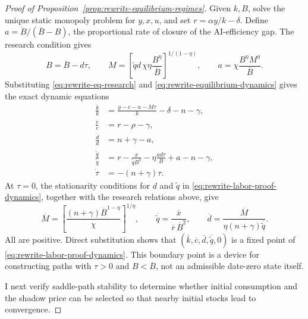\begin{proof}[Proof of Proposition~\ref{prop:rewrite-equilibrium-regimes}]
Given $k,B$, solve the unique static monopoly
problem for $y,x,u$, and set $r=\alpha y/k-\delta$.
Define $a=\dot B/(\overline B-B)$, the proportional rate of closure of the
AI-efficiency gap. The research condition gives
\[
 B=\overline B-d\tau,\qquad
 M=\left[\widetilde qd\,\chi\eta\frac{B^\eta}{\overline B}
       \right]^{1/(1-\eta)},\qquad
 a=\chi\frac{B^\eta M^\eta}{\overline B}.
\]
Substituting \eqref{eq:rewrite-eq-research} and
\eqref{eq:rewrite-equilibrium-dynamics} gives the exact dynamic equations
\begin{subequations}
\label{eq:rewrite-labor-proof-dynamics}
\begin{align}
 \frac{\dot k}{k}&=\frac{y-c-u-M\tau}{k}-\delta-n-\gamma,\\
 \frac{\dot c}{c}&=r-\rho-\gamma,\\
 \frac{\dot d}{d}&=n+\gamma-a,\\
 \frac{\dot{\widetilde q}}{\widetilde q}
 &=r-\frac{x}{\widetilde qB^2}
   -\eta\frac{ad\tau}{B}+a-n-\gamma,\\
 \dot\tau&=-(n+\gamma)\tau.
\end{align}
\end{subequations}
At $\tau=0$, the stationarity conditions for $d$ and $\widetilde q$ in
\eqref{eq:rewrite-labor-proof-dynamics}, together with the research
relations above, give
\begin{equation}
 \overline M=
 \left[\frac{(n+\gamma)\overline B^{1-\eta}}{\chi}\right]^{1/\eta},
 \qquad
 \overline{\widetilde q}=\frac{\overline x}{\overline r\,\overline B^2},
 \qquad
 \overline d=\frac{\overline M}{\eta(n+\gamma)\overline{\widetilde q}}.
 \label{eq:rewrite-labor-terminal-research}
\end{equation}
All are positive. Direct substitution shows that
$(\overline k,\overline c,\overline d,\overline{\widetilde q},0)$
is a fixed point of \eqref{eq:rewrite-labor-proof-dynamics}.
This boundary point is a device for constructing paths with $\tau>0$ and
$B<\overline B$, not an admissible date-zero state itself.

I next verify saddle-path stability to determine whether initial consumption
and the shadow price can be selected so that nearby initial stocks lead
to convergence.


\end{proof}
